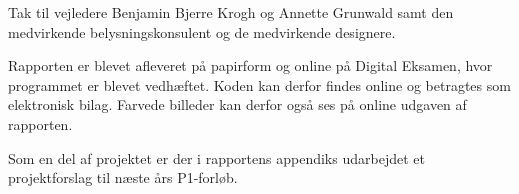 Tak til vejledere Benjamin Bjerre Krogh og Annette Grunwald samt den medvirkende belysningskonsulent og de medvirkende designere.

Rapporten er blevet afleveret på papirform og online på Digital Eksamen, hvor programmet er blevet vedhæftet. Koden kan derfor findes online og betragtes som elektronisk bilag. Farvede billeder kan derfor også ses på online udgaven af rapporten. 

Som en del af projektet er der i rapportens appendiks udarbejdet et projektforslag til næste års P1-forløb.
\clearpage

\clearpage